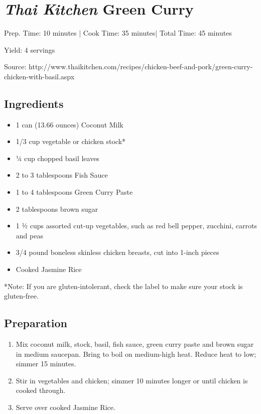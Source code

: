 \section{\emph{Thai Kitchen} Green Curry}

\begin{center}
Prep. Time: 10 minutes |
Cook Time: 35 minutes|
Total Time: 45 minutes
 
Yield: 4 servings

\vspace{1em}

Source: http://www.thaikitchen.com/recipes/chicken-beef-and-pork/green-curry-chicken-with-basil.aspx
\end{center}

\subsection{Ingredients}
\begin{multicols}{2}
\begin{itemize}
    \item 1 can (13.66 ounces)  Coconut Milk
    \item 1/3 cup vegetable or chicken stock*
    \item 1⁄4 cup chopped basil leaves
    \item 2 to 3 tablespoons  Fish Sauce
    \item 1 to 4 tablespoons  Green Curry Paste
    \item 2 tablespoons brown sugar
    \item 1 1⁄2 cups assorted cut-up vegetables, such as red bell pepper, zucchini, carrots and peas
    \item 3/4 pound boneless skinless chicken breasts, cut into 1-inch pieces
    \item Cooked Jasmine Rice
\end{itemize}
\end{multicols}

*Note: If you are gluten-intolerant, check the label to make sure your stock is gluten-free.

\subsection{Preparation}
\begin{enumerate}
    \item Mix coconut milk, stock, basil, fish sauce, green curry paste and brown sugar in medium saucepan. Bring to boil on medium-high heat. Reduce heat to low; simmer 15 minutes.
    \item Stir in vegetables and chicken; simmer 10 minutes longer or until chicken is cooked through.
    \item Serve over cooked Jasmine Rice.
\end{enumerate}
